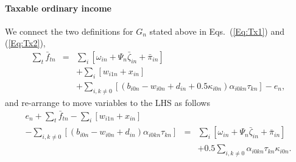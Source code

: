 \documentclass{report}[fleqn,12pt]
\begin{document}
\paragraph*{Taxable ordinary income}
	We connect the two definitions for $G_n$ stated above in Eqs.~(\ref{Eq:Tx1}) and (\ref{Eq:Tx2}),
	\begin{eqnarray}
		\sum_t \bar{f}_{tn} &=&
		\sum_i [\omega_{in} + \Psi_n\bar\zeta_{in} + \bar{\pi}_{in}]  \nonumber \\
		&& + \sum_i [w_{i1n} + x_{in} ]
		\nonumber\\
		&& + \sum_{i,k\neq 0} [(b_{i0n} - w_{i0n} + d_{in}
		     + 0.5\kappa_{i0n})\alpha_{i0kn}\tau_{kn}] - e_n,
	\end{eqnarray}
	and re-arrange to move variables to the LHS as follows
	\begin{eqnarray}
		\label{Eq:C6}
		e_n + \sum_t \bar{f}_{tn}
		- \sum_i [ w_{i1n} + x_{in}] &&
		\nonumber \\
		- \sum_{i,k\neq 0} [(b_{i0n} - w_{i0n} + d_{in})\alpha_{i0kn}\tau_{kn}] &=&
		\sum_i [\omega_{in} + \Psi_n\bar\zeta_{in} + \bar{\pi}_{in} ]
		\nonumber \\
		&& + 0.5\sum_{i,k\neq 0} \alpha_{i0kn}\tau_{kn}\kappa_{i0n}.
	\end{eqnarray}
\end{document}
